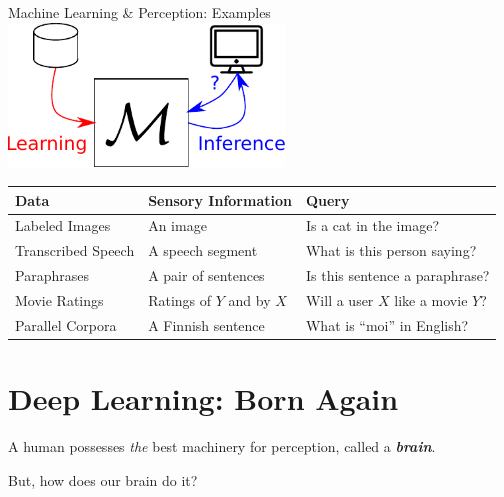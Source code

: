 \documentclass{beamer}
\begin{document}
\begin{frame}{Machine Learning \& Perception: Examples}
    \centering
    \includegraphics[width=0.55\textwidth]{machinelearning.pdf}

    \vspace{2mm}
    \begin{center}
    { \small
    \begin{tabular}{l | l | l}
        \bf Data & \bf Sensory Information & \bf Query\\
        \hline
        \hline
        Labeled Images &
        An image &
        Is a cat in the image? \\
        Transcribed Speech &
        A speech segment &
        What is this person saying?  \\
        Paraphrases &
        A pair of sentences &
        Is this sentence a paraphrase? \\
        Movie Ratings & 
        Ratings of $Y$ and by $X$ & 
        Will a user $X$ like a movie $Y$? \\
        Parallel Corpora &
        A Finnish sentence &
        What is ``moi'' in English?  
    \end{tabular}
    }
\end{center}
\end{frame}

\section{Deep Learning: Born Again}

\begin{frame}
    \centering

    A human possesses \emph{the} best machinery for perception,
    called a \emph{\bf brain}.

    \vspace{2em}
    But, how does our brain do it?

\end{frame}
\end{document}
